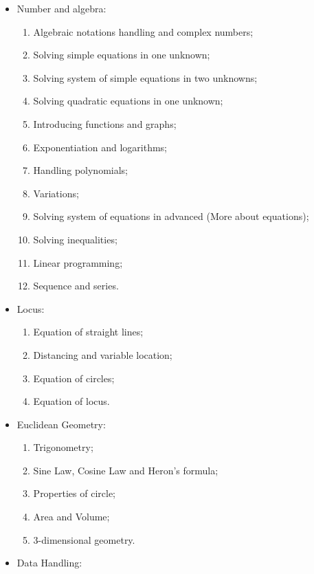 \documentclass{article}
\begin{document}
    \begin{itemize}
        \item Number and algebra:\begin{enumerate}
            \item Algebraic notations handling and complex numbers;
            \item Solving simple equations in one unknown;
            \item Solving system of simple equations in two unknowns;
            \item Solving quadratic equations in one unknown;
            \item Introducing functions and graphs;
            \item Exponentiation and logarithms;
            \item Handling polynomials;
            \item Variations;
            \item Solving system of equations in advanced (More about equations);
            \item Solving inequalities;
            \item Linear programming;
            \item Sequence and series.
        \end{enumerate}
        \item Locus:\begin{enumerate}
            \item Equation of straight lines;
            \item Distancing and variable location;
            \item Equation of circles;
            \item Equation of locus.
        \end{enumerate}
        \item Euclidean Geometry:\begin{enumerate}
            \item Trigonometry;
            \item Sine Law, Cosine Law and Heron's formula;
            \item Properties of circle;
            \item Area and Volume;
            \item 3-dimensional geometry.
        \end{enumerate}
        \item Data Handling:\begin{enumerate}

\end{enumerate}
\end{itemize}
\end{document}
